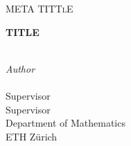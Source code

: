 \begin{titlepage}
  \begin{center}
    \vspace*{1cm}
    \Large
    \scshape{META TITTlE}

    \vspace{2cm}
    \huge
    \textbf{\scshape{TITLE}}

    \vspace{2cm}
    \large
    \\
    \vspace{0.25cm}
    \Large
    \textit{Author}\\
    \vspace{6cm}
    \large
    \\
    \vspace {0.25cm}
    \large
    Supervisor \\
    \vspace{0.25cm}
    \large
    Supervisor\\
    \vspace{3cm}
    Department of Mathematics\\
    ETH Zürich\\
    \vfill

  \end{center}
\end{titlepage}
